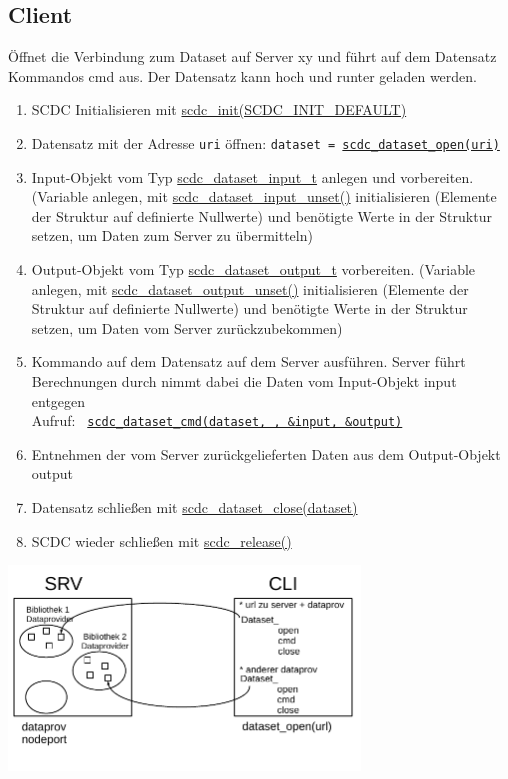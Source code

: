 \subsection{Client}
Öffnet die Verbindung zum Dataset auf Server xy und führt auf dem Datensatz Kommandos cmd aus.
Der Datensatz kann hoch und runter geladen werden.
\begin{enumerate}
	\item SCDC Initialisieren mit \hyperref[scdc_init]{scdc\_init(SCDC\_INIT\_DEFAULT)}
	\item Datensatz mit der Adresse \texttt{uri} öffnen: \texttt{dataset = \hyperref[scdc_dataset_open]{scdc\_dataset\_open(uri)}}
	\item Input-Objekt vom Typ \hyperref[scdc_dataset_input_t]{scdc\_dataset\_input\_t} anlegen und vorbereiten. (Variable anlegen, mit \hyperref[scdc_dataset_input_unset]{scdc\_dataset\_input\_unset()} initialisieren (Elemente der Struktur auf definierte Nullwerte) und benötigte Werte in der Struktur setzen, um Daten zum Server zu übermitteln)
	\item Output-Objekt vom Typ \hyperref[scdc_dataset_output_t]{scdc\_dataset\_output\_t} vorbereiten. (Variable anlegen, mit \hyperref[scdc_dataset_output_unset]{scdc\_dataset\_output\_unset()} initialisieren (Elemente der Struktur auf definierte Nullwerte)  und benötigte Werte in der Struktur setzen, um Daten vom Server zurückzubekommen)
	\item Kommando auf dem Datensatz auf dem Server ausführen. Server führt Berechnungen durch nimmt dabei die Daten vom Input-Objekt input entgegen\\
	      Aufruf: \texttt{ \hyperref[scdc_dataset_cmd]{scdc\_dataset\_cmd(dataset, , \&input, \&output)} }
	\item Entnehmen der vom Server zurückgelieferten Daten aus dem Output-Objekt output
	\item Datensatz schließen mit \hyperref[scdc_dataset_close]{scdc\_dataset\_close(dataset)}
	\item SCDC wieder schließen mit \hyperref[scdc_release]{scdc\_release()}
\end{enumerate}


\begin{center}
 \includegraphics[width=0.7\textwidth]{img/srvcli}
\end{center}
